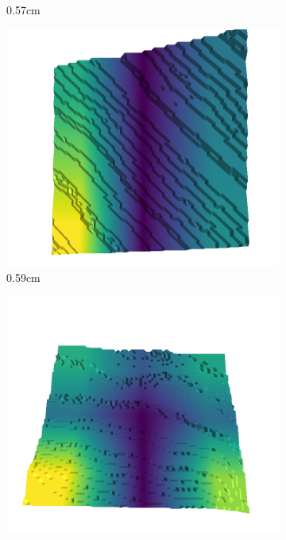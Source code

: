\documentclass[../document.tex]{subfiles}
\begin{document}
\begin{figure}[H]
\begin{subfigure}[b]{0.192\linewidth}
    \caption{0.57cm}
    \label{fig : quarry-best-12}
    \end{subfigure}
    \begin{subfigure}[b]{0.192\linewidth}
    \includegraphics[width=\linewidth]{../img/5/quarry/best/58-patch-3d-majavi-colormap-120.png}
    \caption{0.59cm}
    \label{fig : quarry-best-13}
    \end{subfigure}
    \begin{subfigure}[b]{0.192\linewidth}
    \includegraphics[width=\linewidth]{../img/5/quarry/best/60-patch-3d-majavi-colormap-130.png}

\end{subfigure}
\end{figure}
\end{document}
